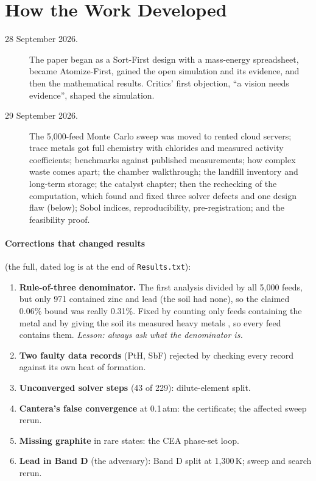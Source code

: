 \documentclass[11pt,a4paper]{article}
\begin{document}
\section{How the Work Developed}
\begin{description}
\item[28 September 2026.] The paper began as a Sort-First design with a mass-energy spreadsheet, became Atomize-First, gained the open simulation and its evidence, and then the mathematical results. Critics' first objection, ``a vision needs evidence'', shaped the simulation.
\item[29 September 2026.] The 5,000-feed Monte Carlo sweep was moved to rented cloud servers; trace metals got full chemistry with chlorides and measured activity coefficients; benchmarks against published measurements; how complex waste comes apart; the chamber walkthrough; the landfill inventory and long-term storage; the catalyst chapter; then the rechecking of the computation, which found and fixed three solver defects and one design flaw (below); Sobol indices, reproducibility, pre-registration; and the feasibility proof.
\end{description}

\paragraph{Corrections that changed results} (the full, dated log is at the end of \texttt{Results.txt}):
\begin{enumerate}
\item \textbf{Rule-of-three denominator.} The first analysis divided by all 5,000 feeds, but only 971 contained zinc and lead (the soil had none), so the claimed 0.06\% bound was really 0.31\%. Fixed by counting only feeds containing the metal and by giving the soil its measured heavy metals \citep{vollprecht2020}, so every feed contains them. \emph{Lesson: always ask what the denominator is.}
\item \textbf{Two faulty data records} (PtH, SbF) rejected by checking every record against its own heat of formation.
\item \textbf{Unconverged solver steps} (43 of 229): dilute-element split.
\item \textbf{Cantera's false convergence} at 0.1\,atm: the certificate; the affected sweep rerun.
\item \textbf{Missing graphite} in rare states: the CEA phase-set loop.
\item \textbf{Lead in Band D} (the adversary): Band D split at 1,300\,K; sweep and search rerun.
\end{enumerate}
\end{document}

